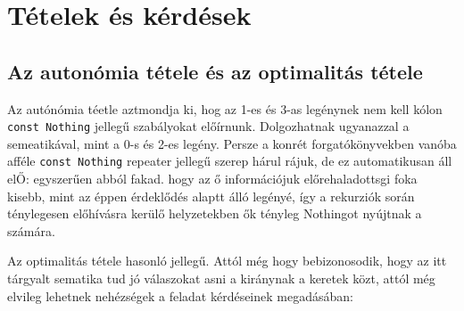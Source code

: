 \documentclass{article}
\newcommand{\blk}{\cellcolor{darkgray}}
\newcommand{\red}{\cellcolor{red!33}}
\newcommand{\grn}{\cellcolor{green!33}}
\newcommand{\just}[1]{\boxed{#1}}%
\newcommand{\incl}{\mathbf{incl}}
\newcommand{\excl}{\mathbf{excl}}
\begin{document}
\begin{comment}
		$2\frac12$	&	\blk		&	\blk		&	\red\just\excl	&	\grn\just\incl	&	\blk		&	\blk		\\\hline
		$2\frac34$	&	\blk		&	\blk		&	\red\just\excl	&	\grn\just\incl	&	\blk		&	\blk		\\\hline
			$3$	&	\blk		&	\blk		&	\blk		&	\blk		&	\blk		&	\blk		\\\hline
		$3\frac14$	&	\blk		&	\blk		&	\blk		&	\blk		&	\blk		&	\blk		\\\hline
		$3\frac12$	&	\blk		&	\blk		&	\blk		&	\blk		&	\blk		&	\blk		\\\hline
		$3\frac34$	&	\blk		&	\blk		&	\blk		&	\blk		&	\blk		&	\blk		\\\hline
		\end{tabular}
	\end{table}





	A ,,negyedes'' legények (1, 3) kitöltéskekor érzékeljük, hogy információveszteség történik: nem figyljük, egy-egy legény mennyi bárányt számol az egyik irányban külön és a másik irányban külön.
	Ez a fajta információvesztés --- ,,a karok vesztesége'' --- a később említendő ,,oprtimalitás tétele'' szempontjából lesz érdekes.

	\end{comment}

	\section{Tételek és kérdések}

	\subsection{Az autonómia tétele és az optimalitás tétele}

	Az autónómia téetle aztmondja ki, hog az 1-es és 3-as legénynek nem kell kólon \texttt{const Nothing} jellegű szabályokat előírnunk.
	Dolgozhatnak ugyanazzal a semeatikával, mint a 0-s és 2-es legény. Persze a konrét forgatókönyvekben vanóba afféle \texttt{const Nothing} repeater jellegű szerep hárul rájuk,
	de ez automatikusan áll elŐ: egyszerűen abból fakad. hogy az ő információjuk előrehaladottsgi foka kisebb, mint az éppen érdeklődés alaptt álló legényé, így a rekurziók során ténylegesen előhívásra kerülő helyzetekben ők tényleg Nothingot nyújtnak a számára.

	Az optimalitás tétele hasonló jellegű. Attól még hogy bebizonosodik, hogy az itt tárgyalt sematika tud jó válaszokat asni a kiránynak a keretek közt, attól még elvileg lehetnek nehézségek a feladat kérdéseinek megadásában:
\end{document}
